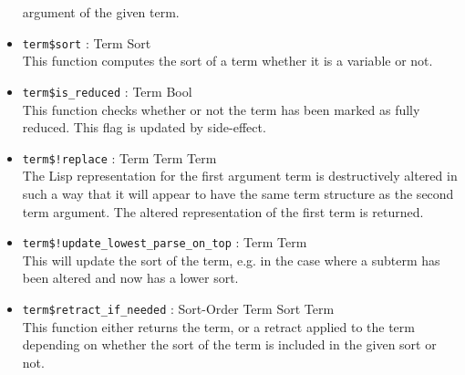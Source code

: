 \begin{itemize}
argument of the given term.
\item {\tt term\$sort} : Term \ra Sort\\
This function computes the sort of a term whether it is a variable or not.
\item {\tt term\$is\_reduced} : Term \ra Bool\\
This function checks whether or not the term has been marked as fully
reduced.  This flag is updated by side-effect.
\item {\tt term\$!replace} : Term Term \ra Term\\
The Lisp representation for the first argument term is destructively altered
in such a way that it will appear to have the same term structure as
the second term argument.  The altered representation of the first
term is returned.
\item {\tt term\$!update\_lowest\_parse\_on\_top} : Term \ra Term\\
This will update the sort of the term, e.g. in the case where a subterm
has been altered and now has a lower sort.
\item {\tt term\$retract\_if\_needed} : Sort-Order Term Sort \ra Term\\
This function either returns the term, or a retract applied to the
term depending on whether the sort of the term is included in the
given sort or not.


\end{itemize}
